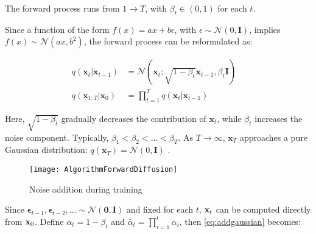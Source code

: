The forward process runs from $1 \to T$, with $\beta_t \in (0, 1)$ for each $t$.

Since a function of the form $f(x) = ax + b\epsilon$, with $\epsilon \sim \mathcal{N}(0, \mathbf{I})$, implies $f(x) \sim \mathcal{N}(ax, b^2)$, the forward process can be reformulated as:

\begin{equation}
	\label{eq:forward_diffusion_process}
	\begin{aligned}
		q(\mathbf{x}_t \vert \mathbf{x}_{t-1}) &= \mathcal{N}(\mathbf{x}_t; \sqrt{1 - \beta_t} \mathbf{x}_{t-1}, \beta_t\mathbf{I}) \quad \\
		q(\mathbf{x}_{1:T} \vert \mathbf{x}_0) &= \prod^T_{t=1} q(\mathbf{x}_t \vert \mathbf{x}_{t-1})
	\end{aligned}
\end{equation}

Here, $\sqrt{1 - \beta_t}$ gradually decreases the contribution of $\mathbf{x}_t$, while $\beta_t$ increases the noise component. Typically, $\beta_1 < \beta_2 < \dots < \beta_T$. As $T \to \infty$, $\mathbf{x}_T$ approaches a pure Gaussian distribution: $q(\mathbf{x}_T) = \mathcal{N}(0, \mathbf{I})$ \cite{weng2021diffusion}.

\begin{figure}[h]
	\centering
	\texttt{[image: AlgorithmForwardDiffusion]}
	\caption{Noise addition during training}
	\label{fig:AlgorithmForwardDiffusion}
\end{figure}

Since $\boldsymbol{\epsilon}_{t-1}, \boldsymbol{\epsilon}_{t-2}, \dots \sim \mathcal{N}(\mathbf{0}, \mathbf{I})$ and fixed for each $t$, $\mathbf{x}_t$ can be computed directly from $\mathbf{x}_0$. Define $\alpha_t = 1 - \beta_t$ and $\bar{\alpha}_t = \prod_{i=1}^t \alpha_i$, then \autoref{eq:addgaussian} becomes:


